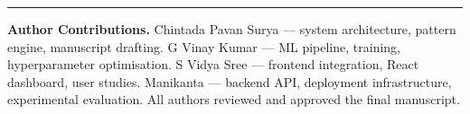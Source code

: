 \documentclass[10pt, twocolumn]{article}
\begin{document}
\vspace{8pt}
\noindent\rule{\columnwidth}{0.4pt}
\vspace{4pt}

{\small
\noindent\textbf{Author Contributions.}
Chintada Pavan Surya --- system architecture, pattern engine, manuscript drafting.
G Vinay Kumar --- ML pipeline, training, hyperparameter optimisation.
S Vidya Sree --- frontend integration, React dashboard, user studies.
Manikanta --- backend API, deployment infrastructure, experimental evaluation.
All authors reviewed and approved the final manuscript.
}
\end{document}
